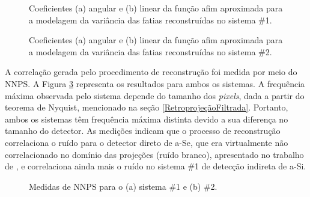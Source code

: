 \begin{figure}[!ht]
	\centering
	\caption{Coeficientes (a) angular e (b) linear da função afim aproximada para a modelagem da variância das fatias reconstruídas no sistema \#1.}
	\hfill
	\label{fig:imgCap6GECoef}
\end{figure}

\begin{figure}[!ht]
	\centering
	\caption{Coeficientes (a) angular e (b) linear da função afim aproximada para a modelagem da variância das fatias reconstruídas no sistema \#2.} 
	\hfill
	\label{fig:imgCap6HOCoef}
\end{figure}

A correlação gerada pelo procedimento de reconstrução foi medida por meio do \acs{NNPS}. A Figura \ref{fig:imgCap6NNPS} representa os resultados para ambos os sistemas. A frequência máxima observada pelo sistema depende do tamanho dos \textit{pixels}, dada a partir do teorema de Nyquist, mencionado na seção \ref{RetroprojeçãoFiltrada}. Portanto, ambos os sistemas têm frequência máxima distinta devido a sua diferença no tamanho do detector. As medições indicam que o processo de reconstrução correlaciona o ruído para o detector direto de \acs{a-Se}, que era virtualmente não correlacionado no domínio das projeções (ruído branco), apresentado no trabalho de ,  e correlaciona ainda mais o ruído no sistema \#1 de detecção indireta de  \acs{a-Si}.

\begin{figure}[!ht]
	\centering
	\caption{Medidas de \acs{NNPS} para o  (a) sistema \#1 e (b) \#2.} 
	\hfill
	\label{fig:imgCap6NNPS}
\end{figure}


